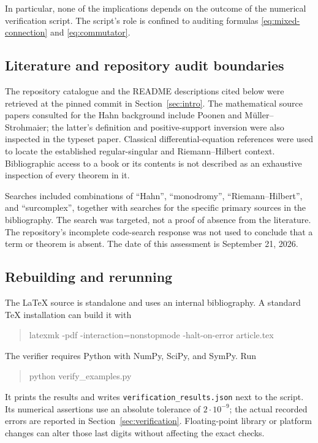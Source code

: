 \documentclass[11pt,letterpaper]{article}
\numberwithin{equation}{section}
\theoremstyle{definition}
\theoremstyle{remark}
\begin{document}
In particular, none of the implications depends on the outcome of the
numerical verification script. The script's role is confined to auditing
formulas \eqref{eq:mixed-connection} and \eqref{eq:commutator}.

\subsection{Literature and repository audit boundaries}
The repository catalogue and the README descriptions cited below were
retrieved at the pinned commit in Section~\ref{sec:intro}. The mathematical
source papers consulted for the Hahn background include Poonen and
M\"uller--Strohmaier; the latter's definition and positive-support inversion
were also inspected in the typeset paper. Classical differential-equation
references were used to locate the established regular-singular and
Riemann--Hilbert context. Bibliographic access to a book or its contents is
not described as an exhaustive inspection of every theorem in it.

Searches included combinations of ``Hahn'', ``monodromy'',
``Riemann--Hilbert'', and ``surcomplex'', together with searches for the
specific primary sources in the bibliography. The search was targeted,
not a proof of absence from the literature. The repository's incomplete
code-search response was not used to conclude that a term or theorem is
absent. The date of this assessment is September 21, 2026.

\subsection{Rebuilding and rerunning}
The LaTeX source is standalone and uses an internal bibliography. A standard
TeX installation can build it with
\begin{quote}\ttfamily\small
latexmk -pdf -interaction=nonstopmode -halt-on-error article.tex
\end{quote}
The verifier requires Python with NumPy, SciPy, and SymPy. Run
\begin{quote}\ttfamily\small
python verify\_examples.py
\end{quote}
It prints the results and writes \texttt{verification\_results.json} next to
the script. Its numerical assertions use an absolute tolerance of
$2\cdot10^{-9}$; the actual recorded errors are reported in
Section~\ref{sec:verification}. Floating-point library or platform changes
can alter those last digits without affecting the exact checks.
\end{document}

